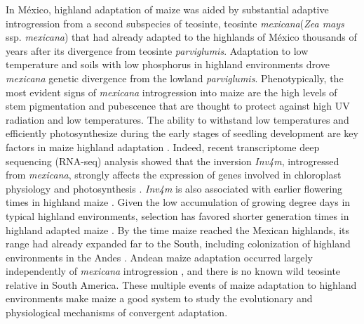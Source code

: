 \documentclass[9pt,twocolumn,twoside,lineno]{biorxiv}
\newcommand{\mex}{\textit{mexicana}\xspace}
\newcommand{\parv}{\textit{parviglumis}\xspace}
\begin{document}
In M\'exico, highland adaptation of maize was aided by substantial adaptive introgression from a second subspecies of teosinte, teosinte \mex (\textit{Zea mays} ssp. \mex) that had already adapted to the highlands of M\'exico thousands of years after its divergence from teosinte \parv \cite{Hufford2013-gs, Gonzalez-Segovia2019-jy}. 
Adaptation to low temperature and soils with low phosphorus in highland environments drove \mex genetic divergence from the lowland \parv \cite{AguirreLiguori2019-fl}.
Phenotypically, the most evident signs of \mex introgression into maize are the high levels of stem pigmentation and pubescence \cite{Lauter2004-eq} that are thought to protect against high UV radiation and low temperatures. 
The ability to withstand low temperatures and efficiently photosynthesize during the early stages of seedling development are key factors in maize highland adaptation \cite{Hardacre1980-tq}.
Indeed, recent transcriptome deep sequencing (RNA-seq) analysis showed that the inversion \textit{Inv4m}, introgressed from \mex, strongly affects the expression of genes involved in chloroplast physiology and photosynthesis \cite{Crow2020-gene}.  
\textit{Inv4m} is also associated with earlier flowering times in highland maize \cite{Romero_Navarro2017-cn, Gates2019-xu}. 
Given the low accumulation of growing degree days in typical highland environments, selection has favored shorter generation  times in highland adapted maize \cite{Gates2019-xu}.
By the time maize reached the Mexican highlands, its range had already expanded far to the South, including colonization of highland environments in the  Andes \cite{Athens2016-ep, Grobman2012-pm}. 
Andean maize adaptation occurred largely independently of \mex introgression \cite{Takuno2015-uj, Wang2020-mp}, and there is no known wild teosinte relative in South America. 
These multiple events of maize adaptation to highland environments make maize a good system to study the evolutionary and physiological mechanisms of convergent adaptation. %
\end{document}
